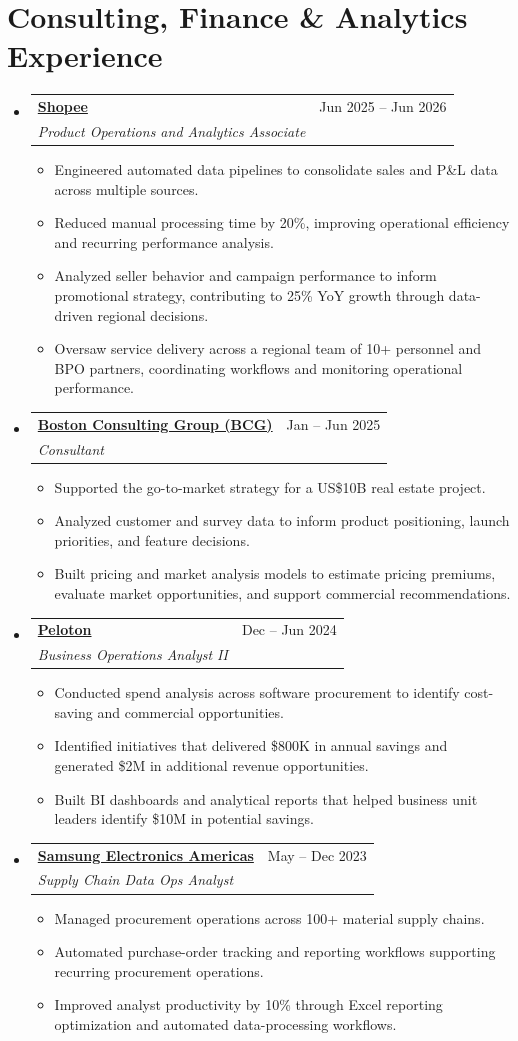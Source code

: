 \documentclass[a4paper,11pt]{article}
\makeatletter
\newcommand{\resumeItem}[1]{
  \item\small{
    {#1 \vspace{-2pt}}
  }
}
\newcommand{\resumeSubheading}[4]{
  \vspace{-2pt}\item
    \begin{tabular*}{0.97\textwidth}[t]{l@{\extracolsep{\fill}}r}
      \textbf{#1} & #2 \\
      \textit{\small#3} & \textit{\small #4} \\
    \end{tabular*}\vspace{-7pt}
}
\newcommand{\resumeSubHeadingListStart}{\begin{itemize}[leftmargin=0.15in, label={}]}
\newcommand{\resumeSubHeadingListEnd}{\end{itemize}}
\newcommand{\resumeItemListStart}{\begin{itemize}}
\newcommand{\resumeItemListEnd}{\end{itemize}\vspace{-5pt}}
\makeatother
\begin{document}
\section{Consulting, Finance \& Analytics Experience}
\resumeSubHeadingListStart
  \resumeSubheading
    {\href{https://www.sea.com/products/shopee}{Shopee}}{Jun 2025 -- Jun 2026}
    {Product Operations and Analytics Associate}{}
    \resumeItemListStart
      \resumeItem{Engineered automated data pipelines to consolidate sales and P\&L data across multiple sources.}
      \resumeItem{Reduced manual processing time by 20\%, improving operational efficiency and recurring performance analysis.}
      \resumeItem{Analyzed seller behavior and campaign performance to inform promotional strategy, contributing to 25\% YoY growth through data-driven regional decisions.}
      \resumeItem{Oversaw service delivery across a regional team of 10+ personnel and BPO partners, coordinating workflows and monitoring operational performance.}
    \resumeItemListEnd
  \resumeSubheading
    {\href{https://www.bcg.com/about/overview}{Boston Consulting Group (BCG)}}{Jan -- Jun 2025}
    {Consultant}{}
    \resumeItemListStart
      \resumeItem{Supported the go-to-market strategy for a US\$10B real estate project.}
      \resumeItem{Analyzed customer and survey data to inform product positioning, launch priorities, and feature decisions.}
      \resumeItem{Built pricing and market analysis models to estimate pricing premiums, evaluate market opportunities, and support commercial recommendations.}
    \resumeItemListEnd
  \resumeSubheading
    {\href{https://www.onepeloton.com/company}{Peloton}}{Dec -- Jun 2024}
    {Business Operations Analyst II}{}
    \resumeItemListStart
      \resumeItem{Conducted spend analysis across software procurement to identify cost-saving and commercial opportunities.}
      \resumeItem{Identified initiatives that delivered \$800K in annual savings and generated \$2M in additional revenue opportunities.}
      \resumeItem{Built BI dashboards and analytical reports that helped business unit leaders identify \$10M in potential savings.}
    \resumeItemListEnd
  \resumeSubheading
    {\href{https://www.samsung.com/us/about-us/our-business/}{Samsung Electronics Americas}}{May -- Dec 2023}
    {Supply Chain Data Ops Analyst}{}
    \resumeItemListStart
      \resumeItem{Managed procurement operations across 100+ material supply chains.}
      \resumeItem{Automated purchase-order tracking and reporting workflows supporting recurring procurement operations.}
      \resumeItem{Improved analyst productivity by 10\% through Excel reporting optimization and automated data-processing workflows.}
    \resumeItemListEnd
\resumeSubHeadingListEnd
\end{document}
